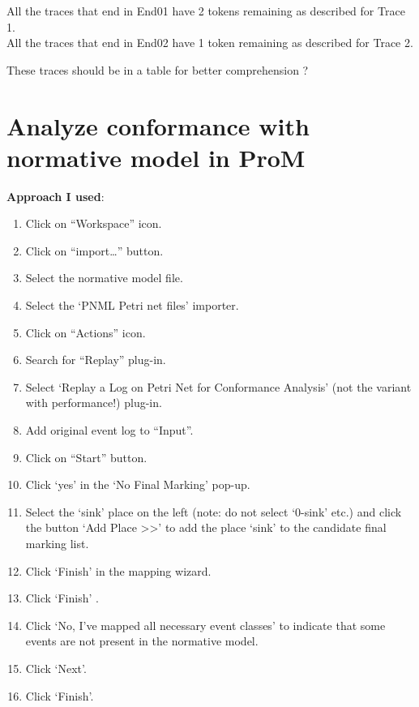 \documentclass[]{article}
\begin{document}
All the traces that end in End01 have 2 tokens remaining as described
for Trace 1.\\All the traces that end in End02 have 1 token remaining as
described for Trace 2.

These traces should be in a table for better comprehension ?

\section{Analyze conformance with normative model in
ProM}\label{analyze-conformance-with-normative-model-in-prom}

\textbf{Approach I used}:

\begin{enumerate}
\def\labelenumi{\arabic{enumi}.}
\itemsep1pt\parskip0pt
\item
  Click on ``Workspace'' icon.\\
\item
  Click on ``import\ldots{}'' button.\\
\item
  Select the normative model file.\\
\item
  Select the `PNML Petri net files' importer.\\
\item
  Click on ``Actions'' icon.\\
\item
  Search for ``Replay'' plug-in.\\
\item
  Select `Replay a Log on Petri Net for Conformance Analysis' (not the
  variant with performance!) plug-in.
\item
  Add original event log to ``Input''.\\
\item
  Click on ``Start'' button.\\
\item
  Click `yes' in the `No Final Marking' pop-up.
\item
  Select the `sink' place on the left (note: do not select `0-sink'
  etc.) and click the button `Add Place \textgreater{}\textgreater{}' to
  add the place `sink' to the candidate final marking list.
\item
  Click `Finish' in the mapping wizard.\\
\item
  Click `Finish' .\\
\item
  Click `No, I've mapped all necessary event classes' to indicate that
  some events are not present in the normative model.\\
\item
  Click `Next'.\\
\item
  Click `Finish'.
\end{enumerate}
\end{document}
